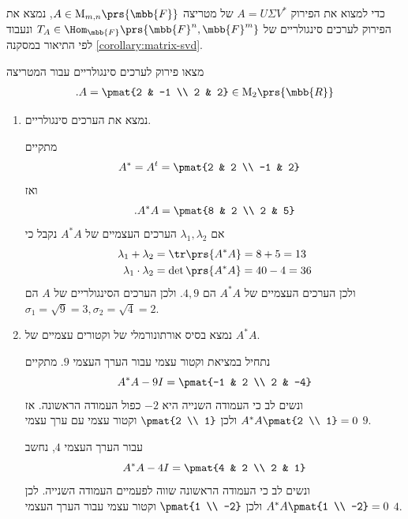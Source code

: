 \documentclass[a4paper,10pt,twoside,openany]{book}
\renewcommand{\Mat}{\mathrm{M}}
\begin{document}
\begin{remark}
כדי למצוא את הפירוק
$A = U \Sigma V^*$
של מטריצה
$A \in \Mat_{m,n}\prs{\mbb{F}}$,
נמצא את הפירוק לערכים סינגולריים של
$T_A \in \Hom_{\mbb{F}}\prs{\mbb{F}^n, \mbb{F}^m}$
ונעבוד לפי התיאור במסקנה
\ref{corollary:matrix-svd}.
\end{remark}

\begin{exercisechap}
מצאו פירוק לערכים סינגולריים עבור המטריצה
\begin{align*}
\text{.} A = \pmat{2 & -1 \\ 2 & 2} \in \Mat_2\prs{\mbb{R}}
\end{align*}
\end{exercisechap}

\begin{solution}
\begin{enumerate}
\item נמצא את הערכים סינגולריים.

מתקיים
\begin{align*}
A^* &= A^t = \pmat{2 & 2 \\ -1 & 2}
\end{align*}
ואז
\begin{align*}
\text{.} A^* A = \pmat{8 & 2 \\ 2 & 5}
\end{align*}
אם
$\lambda_1, \lambda_2$
הערכים העצמיים של
$A^* A$
נקבל כי
\begin{align*}
\lambda_1 + \lambda_2 &= \tr\prs{A^* A} = 8 + 5 = 13 \\
\lambda_1 \cdot \lambda_2 &= \det\prs{A^* A} = 40 - 4 = 36
\end{align*}
ולכן הערכים העצמיים של
$A^* A$
הם
$4,9$.
ולכן הערכים הסינגולריים של
$A$
הם
$\sigma_1 = \sqrt{9} = 3, \sigma_2 = \sqrt{4} = 2$.

\item
נמצא בסיס אורתונורמלי של וקטורים עצמיים של
$A^* A$.

נתחיל במציאת וקטור עצמי עבור הערך העצמי
$9$.
מתקיים
\[A^* A - 9I = \pmat{-1 & 2 \\ 2 & -4}\]
ונשים לב כי העמודה השנייה היא
$-2$
כפול העמודה הראשונה. אז
$A^* A \pmat{2 \\ 1} = 0$
ולכן
$\pmat{2 \\ 1}$
וקטור עצמי עם ערך עצמי
$9$.

עבור הערך העצמי
$4$,
נחשב
\[A^* A - 4I = \pmat{4 & 2 \\ 2 & 1}\]
ונשים לב כי העמודה הראשונה שווה לפעמיים העמודה השנייה. לכן
$A^* A \pmat{1 \\ -2} = 0$
ולכן
$\pmat{1 \\ -2}$
וקטור עצמי עבור הערך העצמי
$4$.


\end{enumerate}
\end{solution}
\end{document}
